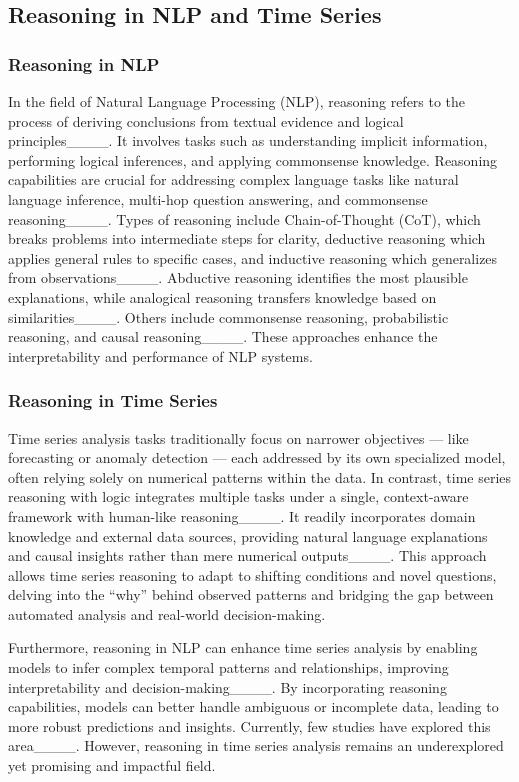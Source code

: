 \begin{table*}[t]
{\begin{tabular}{p{3.5cm}p{5.5cm}p{4.5cm}p{6cm}}
            \bottomrule
        \end{tabular}
    }
    \label{tab:reasoning_types}
\end{table*}


\subsection{Reasoning in NLP and Time Series}

\subsubsection{Reasoning in NLP}
In the field of Natural Language Processing (NLP), reasoning refers to the process of deriving conclusions from textual evidence and logical principles____. It involves tasks such as understanding implicit information, performing logical inferences, and applying commonsense knowledge. Reasoning capabilities are crucial for addressing complex language tasks like natural language inference, multi-hop question answering, and commonsense reasoning____. Types of reasoning include Chain-of-Thought (CoT), which breaks problems into intermediate steps for clarity, deductive reasoning which applies general rules to specific cases, and inductive reasoning which generalizes from observations____. Abductive reasoning identifies the most plausible explanations, while analogical reasoning transfers knowledge based on similarities____. Others include commonsense reasoning, probabilistic reasoning, and causal reasoning____. These approaches enhance the interpretability and performance of NLP systems. 

\subsubsection{Reasoning in Time Series}
Time series analysis tasks traditionally focus on narrower objectives — like forecasting or anomaly detection — each addressed by its own specialized model, often relying solely on numerical patterns within the data. In contrast, time series reasoning with logic integrates multiple tasks under a single, context-aware framework with human-like reasoning____. It readily incorporates domain knowledge and external data sources, providing natural language explanations and causal insights rather than mere numerical outputs____. This approach allows time series reasoning to adapt to shifting conditions and novel questions, delving into the “why” behind observed patterns and bridging the gap between automated analysis and real-world decision-making.

Furthermore, reasoning in NLP can enhance time series analysis by enabling models to infer complex temporal patterns and relationships, improving interpretability and decision-making____. By incorporating reasoning capabilities, models can better handle ambiguous or incomplete data, leading to more robust predictions and insights. Currently, few studies have explored this area____. However, reasoning in time series analysis remains an underexplored yet promising and impactful field.